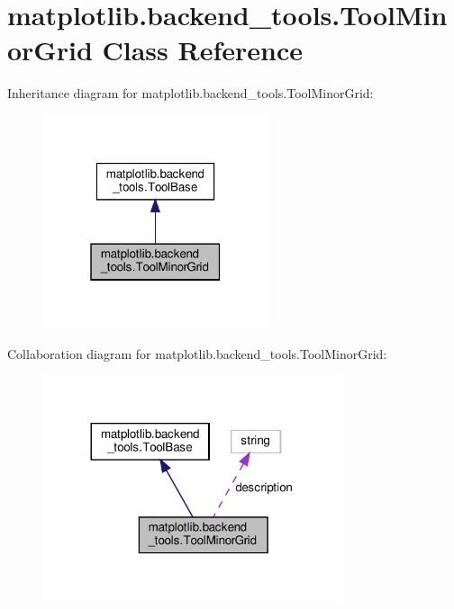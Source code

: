 \hypertarget{classmatplotlib_1_1backend__tools_1_1ToolMinorGrid}{}\section{matplotlib.\+backend\+\_\+tools.\+Tool\+Minor\+Grid Class Reference}
\label{classmatplotlib_1_1backend__tools_1_1ToolMinorGrid}


Inheritance diagram for matplotlib.\+backend\+\_\+tools.\+Tool\+Minor\+Grid\+:
\nopagebreak
\begin{figure}[H]
\begin{center}
\leavevmode
\includegraphics[width=187pt]{classmatplotlib_1_1backend__tools_1_1ToolMinorGrid__inherit__graph}
\end{center}
\end{figure}


Collaboration diagram for matplotlib.\+backend\+\_\+tools.\+Tool\+Minor\+Grid\+:
\nopagebreak
\begin{figure}[H]
\begin{center}
\leavevmode
\includegraphics[width=248pt]{classmatplotlib_1_1backend__tools_1_1ToolMinorGrid__coll__graph}
\end{center}
\end{figure}
